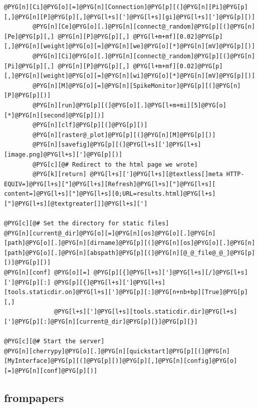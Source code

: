 \documentclass[letterpaper,10pt,english]{manual}
\begin{document}
\begin{Verbatim}[commandchars=@\[\]]
        @PYG[n][Ci]@PYG[o][=]@PYG[n][Connection]@PYG[p][(]@PYG[n][Pi]@PYG[p][,]@PYG[n][P]@PYG[p][,]@PYG[l+s][']@PYG[l+s][gi]@PYG[l+s][']@PYG[p][)]
        @PYG[n][Ce]@PYG[o][.]@PYG[n][connect@_random]@PYG[p][(]@PYG[n][Pe]@PYG[p][,] @PYG[n][P]@PYG[p][,] @PYG[l+m+mf][0.02]@PYG[p][,]@PYG[n][weight]@PYG[o][=]@PYG[n][we]@PYG[o][*]@PYG[n][mV]@PYG[p][)]
        @PYG[n][Ci]@PYG[o][.]@PYG[n][connect@_random]@PYG[p][(]@PYG[n][Pi]@PYG[p][,] @PYG[n][P]@PYG[p][,] @PYG[l+m+mf][0.02]@PYG[p][,]@PYG[n][weight]@PYG[o][=]@PYG[n][wi]@PYG[o][*]@PYG[n][mV]@PYG[p][)]
        @PYG[n][M]@PYG[o][=]@PYG[n][SpikeMonitor]@PYG[p][(]@PYG[n][P]@PYG[p][)]
        @PYG[n][run]@PYG[p][(]@PYG[o][.]@PYG[l+m+mi][5]@PYG[o][*]@PYG[n][second]@PYG[p][)]
        @PYG[n][clf]@PYG[p][(]@PYG[p][)]
        @PYG[n][raster@_plot]@PYG[p][(]@PYG[n][M]@PYG[p][)]
        @PYG[n][savefig]@PYG[p][(]@PYG[l+s][']@PYG[l+s][image.png]@PYG[l+s][']@PYG[p][)]
        @PYG[c][@# Redirect to the html page we wrote]
        @PYG[k][return] @PYG[l+s][']@PYG[l+s][@textless[]meta HTTP-EQUIV=]@PYG[l+s]["]@PYG[l+s][Refresh]@PYG[l+s]["]@PYG[l+s][ content=]@PYG[l+s]["]@PYG[l+s][0;URL=results.html]@PYG[l+s]["]@PYG[l+s][@textgreater[]]@PYG[l+s][']

@PYG[c][@# Set the directory for static files]
@PYG[n][current@_dir]@PYG[o][=]@PYG[n][os]@PYG[o][.]@PYG[n][path]@PYG[o][.]@PYG[n][dirname]@PYG[p][(]@PYG[n][os]@PYG[o][.]@PYG[n][path]@PYG[o][.]@PYG[n][abspath]@PYG[p][(]@PYG[n][@_@_file@_@_]@PYG[p][)]@PYG[p][)]
@PYG[n][conf] @PYG[o][=] @PYG[p][{]@PYG[l+s][']@PYG[l+s][/]@PYG[l+s][']@PYG[p][:] @PYG[p][{]@PYG[l+s][']@PYG[l+s][tools.staticdir.on]@PYG[l+s][']@PYG[p][:]@PYG[n+nb+bp][True]@PYG[p][,]
              @PYG[l+s][']@PYG[l+s][tools.staticdir.dir]@PYG[l+s][']@PYG[p][:]@PYG[n][current@_dir]@PYG[p][}]@PYG[p][}]

@PYG[c][@# Start the server]
@PYG[n][cherrypy]@PYG[o][.]@PYG[n][quickstart]@PYG[p][(]@PYG[n][MyInterface]@PYG[p][(]@PYG[p][)]@PYG[p][,]@PYG[n][config]@PYG[o][=]@PYG[n][conf]@PYG[p][)]
\end{Verbatim}


\subsection{frompapers}

\resetcurrentobjects
\hypertarget{--doc-examples-frompapers_Brette_Gerstner_2005}{}
\end{document}
